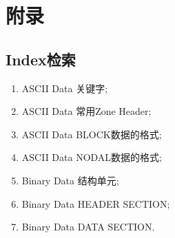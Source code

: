 \documentclass[lang=cn,11pt,a4paper]{elegantpaper}
\begin{document}
\section{附录}

\subsection{Index检索}
\begin{enumerate}[label=\arabic*).]
  \item ASCII Data 关键字; 
  \item ASCII Data 常用Zone Header; 
  \item ASCII Data BLOCK数据的格式; 
  \item ASCII Data NODAL数据的格式; 
  \item Binary Data 结构单元; 
  \item Binary Data HEADER SECTION; 
  \item Binary Data DATA SECTION. 
\end{enumerate}
\end{document}
